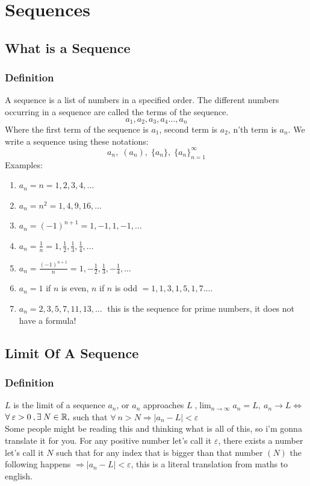 \chapter{Sequences}


\section{What is a Sequence}
\subsection{Definition}
A sequence is a list of numbers in a specified order. The different numbers occurring in a sequence are called the terms of the sequence.\\
\[
    a_1,a_2,a_3,a_4\ldots,a_n
\]
Where the first term of the sequence is $a_1$, second term is $a_2$, n'th term is $a_n$.
We write a sequence using these notations:\\
\[
    a_n , \; (a_n), \; \{a_n\}, \; \{a_n\}_{n=1}^\infty
\]
Examples:\\
\begin{enumerate}
    \item $a_n = n = 1,2,3,4,\ldots$
    \item $a_n = n^2 = 1,4,9,16,\ldots$
    \item $a_n = (-1)^{n+1} = 1,-1,1,-1,\ldots$
    \item $a_n = \frac{1}{n} = 1,\frac{1}{2},\frac{1}{3},\frac{1}{4},\ldots$
    \item $a_n = \frac{(-1)^{n+1}}{n} = 1,-\frac{1}{2},\frac{1}{3},-\frac{1}{4},\ldots$
    \item $a_n = 1$ if $n$ is even, $n$ if $n$ is odd $= 1,1,3,1,5,1,7.\ldots$
    \item $a_n = 2,3,5,7,11,13,\ldots\;$ this is the sequence for prime numbers, it does not have a formula!
\end{enumerate}



\section{Limit Of A Sequence}
\subsection{Definition}
$L$ is the limit of a sequence $a_n$, or $a_n$ approaches $L\;$,$\lim_{n\to \infty} a_n = L,\: a_n\rightarrow L \iff$\\
$\forall\: \varepsilon>0 \:, \exists \: N\in \mathbb{R},$ such that $\forall \: n>N \Longrightarrow |a_n - L|<\varepsilon$\\
Some people might be reading this and thinking what is all of this, so i'm gonna translate it for you.
For any positive number let's call it $\varepsilon$, there exists a number let's call it $N$ such that for any index that is bigger than that number $(N)$ the following happens $\Longrightarrow |a_n-L|<\varepsilon$, this is a literal translation from maths to english.\\\\


